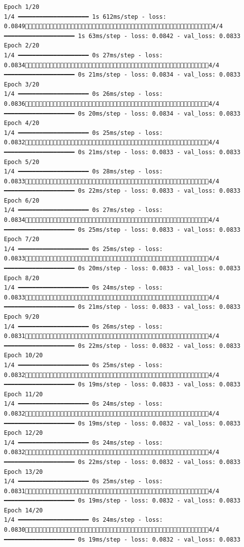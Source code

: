 \documentclass[
  letterpaper,
  DIV=11,
  numbers=noendperiod]{scrreprt}
\begin{document}
\begin{verbatim}
Epoch 1/20
1/4 ━━━━━━━━━━━━━━━━━━━━ 1s 612ms/step - loss: 0.08494/4 ━━━━━━━━━━━━━━━━━━━━ 1s 63ms/step - loss: 0.0842 - val_loss: 0.0833
Epoch 2/20
1/4 ━━━━━━━━━━━━━━━━━━━━ 0s 27ms/step - loss: 0.08344/4 ━━━━━━━━━━━━━━━━━━━━ 0s 21ms/step - loss: 0.0834 - val_loss: 0.0833
Epoch 3/20
1/4 ━━━━━━━━━━━━━━━━━━━━ 0s 26ms/step - loss: 0.08364/4 ━━━━━━━━━━━━━━━━━━━━ 0s 20ms/step - loss: 0.0834 - val_loss: 0.0833
Epoch 4/20
1/4 ━━━━━━━━━━━━━━━━━━━━ 0s 25ms/step - loss: 0.08324/4 ━━━━━━━━━━━━━━━━━━━━ 0s 21ms/step - loss: 0.0833 - val_loss: 0.0833
Epoch 5/20
1/4 ━━━━━━━━━━━━━━━━━━━━ 0s 28ms/step - loss: 0.08334/4 ━━━━━━━━━━━━━━━━━━━━ 0s 22ms/step - loss: 0.0833 - val_loss: 0.0833
Epoch 6/20
1/4 ━━━━━━━━━━━━━━━━━━━━ 0s 27ms/step - loss: 0.08344/4 ━━━━━━━━━━━━━━━━━━━━ 0s 25ms/step - loss: 0.0833 - val_loss: 0.0833
Epoch 7/20
1/4 ━━━━━━━━━━━━━━━━━━━━ 0s 25ms/step - loss: 0.08334/4 ━━━━━━━━━━━━━━━━━━━━ 0s 20ms/step - loss: 0.0833 - val_loss: 0.0833
Epoch 8/20
1/4 ━━━━━━━━━━━━━━━━━━━━ 0s 24ms/step - loss: 0.08334/4 ━━━━━━━━━━━━━━━━━━━━ 0s 21ms/step - loss: 0.0833 - val_loss: 0.0833
Epoch 9/20
1/4 ━━━━━━━━━━━━━━━━━━━━ 0s 26ms/step - loss: 0.08314/4 ━━━━━━━━━━━━━━━━━━━━ 0s 22ms/step - loss: 0.0832 - val_loss: 0.0833
Epoch 10/20
1/4 ━━━━━━━━━━━━━━━━━━━━ 0s 25ms/step - loss: 0.08324/4 ━━━━━━━━━━━━━━━━━━━━ 0s 19ms/step - loss: 0.0833 - val_loss: 0.0833
Epoch 11/20
1/4 ━━━━━━━━━━━━━━━━━━━━ 0s 24ms/step - loss: 0.08324/4 ━━━━━━━━━━━━━━━━━━━━ 0s 19ms/step - loss: 0.0832 - val_loss: 0.0833
Epoch 12/20
1/4 ━━━━━━━━━━━━━━━━━━━━ 0s 24ms/step - loss: 0.08324/4 ━━━━━━━━━━━━━━━━━━━━ 0s 22ms/step - loss: 0.0832 - val_loss: 0.0833
Epoch 13/20
1/4 ━━━━━━━━━━━━━━━━━━━━ 0s 25ms/step - loss: 0.08314/4 ━━━━━━━━━━━━━━━━━━━━ 0s 19ms/step - loss: 0.0832 - val_loss: 0.0833
Epoch 14/20
1/4 ━━━━━━━━━━━━━━━━━━━━ 0s 24ms/step - loss: 0.08304/4 ━━━━━━━━━━━━━━━━━━━━ 0s 19ms/step - loss: 0.0832 - val_loss: 0.0833

\end{verbatim}
\end{document}
